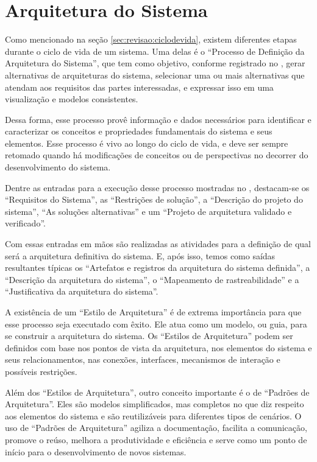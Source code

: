 	\section{Arquitetura do Sistema}\label{sec:revisao:arqSistema}

	Como mencionado na seção \ref{sec:revisao:ciclodevida}, existem diferentes etapas durante o ciclo de vida de
	um sistema. Uma delas é o ``Processo de Definição da Arquitetura do Sistema'', que tem como objetivo, conforme registrado
	no \cite{incoseHandbook}, gerar alternativas de arquiteturas do sistema, selecionar uma ou mais alternativas que atendam aos
	requisitos das partes interessadas, e expressar isso em uma visualização e modelos consistentes.

	Dessa forma, esse processo provê informação e dados necessários para identificar e caracterizar os conceitos e
	propriedades fundamentais do sistema e seus elementos. Esse processo é vivo ao longo do ciclo de vida, e deve ser sempre
	retomado quando há modificações de conceitos ou de perspectivas no decorrer do desenvolvimento do sistema.

	Dentre as entradas para a execução desse processo mostradas no \cite{incoseHandbook}, destacam-se os ``Requisitos do Sistema'',
	as ``Restrições de solução'', a ``Descrição do projeto do sistema'', ``As soluções alternativas'' e um ``Projeto de arquitetura validado e verificado''.

	Com essas entradas em mãos são realizadas as atividades para a definição de qual será a arquitetura definitiva do sistema. E, após
	isso, temos como saídas resultantes típicas os ``Artefatos e registros da arquitetura do sistema definida'', a ``Descrição da 
	arquitetura do sistema'', o ``Mapeamento de rastreabilidade'' e a ``Justificativa da arquitetura do sistema''.
	 
	A existência de um ``Estilo de Arquitetura'' é de extrema importância para que esse processo seja executado com êxito.
	Ele atua como um modelo, ou guia, para se construir a arquitetura do sistema. Os ``Estilos de Arquitetura'' podem 
	ser definidos com base nos pontos de vista da arquitetura, nos elementos do
	sistema e seus relacionamentos, nas conexões, interfaces, mecanismos de interação e possíveis restrições.
	
	Além dos ``Estilos de Arquitetura'', outro conceito importante é o de ``Padrões de Arquitetura''. 
	Eles são modelos simplificados, mas completos no que diz respeito aos elementos do
	sistema e são reutilizáveis para diferentes tipos de cenários. O uso de ``Padrões de Arquitetura'' agiliza a 
	documentação, facilita a comunicação, promove o reúso, melhora a produtividade
	e eficiência e serve como um ponto de início para o desenvolvimento de novos sistemas.


